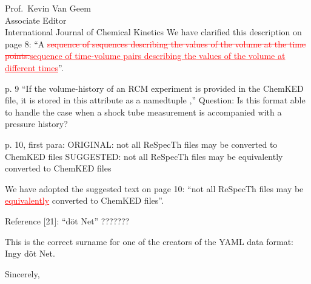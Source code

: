 \documentclass[11pt]{OSUletter}
\newcommand{\addtwo}[1]{{\sloppy\textcolor{red}{\uline{#1}}}}  %
\newcommand{\deletetwo}[1]{\sloppy\textcolor{red}{\sout{#1}}}    %
\begin{document}
\begin{letter}{
               Prof.~Kevin Van Geem\\
               Associate Editor\\
               International Journal of Chemical Kinetics
               }
We have clarified this description on page 8:
``A \deletetwo{sequence of sequences describing the values of
the volume at the time points.}\addtwo{sequence of time-volume pairs describing the values
of the volume at different times}''.

\begin{quoting}
    p. 9
    ``If the volume-history of an RCM experiment is provided in the
    ChemKED file, it is stored in this attribute as a namedtuple ,''
    Question: Is this format able to handle the case when a shock tube measurement
    is accompanied with a pressure history?
\end{quoting}



\begin{quoting}
    p. 10, first para:
    ORIGINAL:
    not all ReSpecTh files may be converted to ChemKED files
    SUGGESTED:
    not all ReSpecTh files may be equivalently converted to ChemKED files
\end{quoting}

We have adopted the suggested text on page 10:
``not all ReSpecTh files may be \addtwo{equivalently} converted to ChemKED files''.

\begin{quoting}
    Reference [21]:
    ``döt Net''   ???????
\end{quoting}

This is the correct surname for one of the creators of the YAML data format: Ingy döt Net.


\closing{Sincerely,}




\end{letter}
\end{document}
